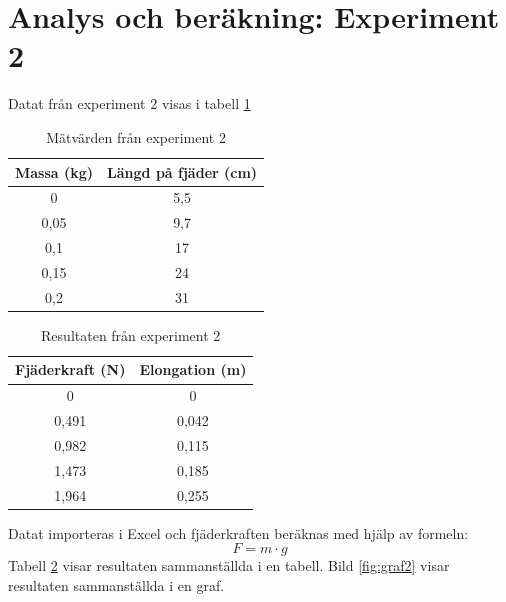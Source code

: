 \documentclass[11p, titlepage, oneside, a4paper]{article}
\begin{document}
        \section{Analys och beräkning: Experiment 2}
        Datat från experiment 2 visas i tabell \ref{table:result2}

\begin{table}
    \begin{center}
        \begin{tabular}{ |c|c| }
            \hline
            Massa (kg) & Längd på fjäder (cm)  \\
            \hline
            0 & 5,5 \\
            0,05 & 9,7 \\
            0,1 & 17 \\
            0,15 & 24 \\
            0,2 & 31 \\
            \hline
        \end{tabular}
        \caption{Mätvärden från experiment 2}
        \label{table:result2}
    \end{center}
\end{table}

\begin{table}
    \begin{center}
        \begin{tabular}{ |c|c| }
            \hline
            Fjäderkraft (N) & Elongation (m)  \\
            \hline
            0 & 0 \\
            0,491 & 0,042 \\
            0,982 & 0,115 \\
            1,473 & 0,185 \\
            1,964 & 0,255 \\
            \hline
        \end{tabular}
        \caption{Resultaten från experiment 2}
        \label{table:result2.1}
    \end{center}
\end{table}


        Datat importeras i Excel och fjäderkraften beräknas med hjälp av formeln:
        \begin{equation}
            F = {m}\cdot{g}
        \end{equation}
        Tabell \ref{table:result2.1} visar resultaten sammanställda i en tabell.
        Bild \ref{fig:graf2} visar resultaten sammanställda i en graf.
\end{document}
